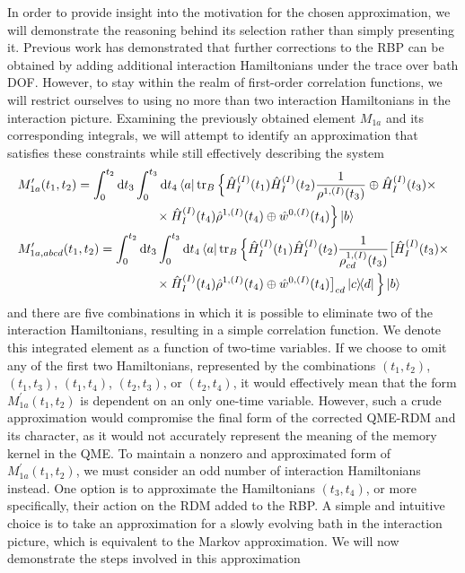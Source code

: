 In order to provide insight into the motivation for the chosen approximation, we will demonstrate the reasoning behind its selection rather than simply presenting it. Previous work has demonstrated that further corrections to the RBP can be obtained by adding additional interaction Hamiltonians under the trace over bath DOF. However, to stay within the realm of first-order correlation functions, we will restrict ourselves to using no more than two interaction Hamiltonians in the interaction picture. Examining the previously obtained element $M_{1a}$ and its corresponding integrals, we will attempt to identify an approximation that satisfies these constraints while still effectively describing the system
\begin{equation}
    \begin{aligned}
    &M_{1a}^\prime(t_1, t_2) = \int_{0}^{t_2} \mathrm{d} t_3 \int_{0}^{t_3} \mathrm{d} t_4 \bra{a}\operatorname{tr}_B \Big\{ \hat{H}_{I}^{(I)}(t_1) \hat{H}_{I}^{(I)}(t_2) \frac{1}{\rho^{1, (I)}(t_3)} \oplus \hat{H}_{I}^{(I)}(t_3) \times \\
    & \quad \quad \quad \quad \quad \quad \quad \quad \quad \quad \quad  \times\hat{H}_{I}^{(I)}(t_4) \hat{\rho}^{1, (I)}(t_4) \oplus \hat{w}^{0, (I)}(t_4)\Big\} \ket{b} \\
    &M_{1a,abcd}^\prime(t_1, t_2) = \int_{0}^{t_2} \mathrm{d} t_3 \int_{0}^{t_3} \mathrm{d} t_4 \bra{a}\operatorname{tr}_B \Big\{ \hat{H}_{I}^{(I)}(t_1) \hat{H}_{I}^{(I)}(t_2) \frac{1}{\rho_{cd}^{1, (I)}(t_3)}\big[\hat{H}_{I}^{(I)}(t_3) \times \\
    & \quad \quad \quad \quad \quad \quad \quad \quad \quad \quad \quad  \times\hat{H}_{I}^{(I)}(t_4) \hat{\rho}^{1, (I)}(t_4) \oplus \hat{w}^{0, (I)}(t_4)\big]_{cd} \ketbra{c}{d}\Big\} \ket{b} \\
    \end{aligned} 
\end{equation}
and there are five combinations in which it is possible to eliminate two of the interaction Hamiltonians, resulting in a simple correlation function. We denote this integrated element as a function of two-time variables. If we choose to omit any of the first two Hamiltonians, represented by the combinations $(t_1, t_2)$, $(t_1, t_3)$, $(t_1, t_4)$, $(t_2, t_3)$, or $(t_2, t_4)$, it would effectively mean that the form $M_{1a}^\prime(t_1, t_2)$ is dependent on an only one-time variable. However, such a crude approximation would compromise the final form of the corrected QME-RDM and its character, as it would not accurately represent the meaning of the memory kernel in the QME. To maintain a nonzero and approximated form of $M_{1a}^\prime(t_1, t_2)$, we must consider an odd number of interaction Hamiltonians instead. One option is to approximate the Hamiltonians $(t_3, t_4)$, or more specifically, their action on the RDM added to the RBP. A simple and intuitive choice is to take an approximation for a slowly evolving bath in the interaction picture, which is equivalent to the Markov approximation. We will now demonstrate the steps involved in this approximation
